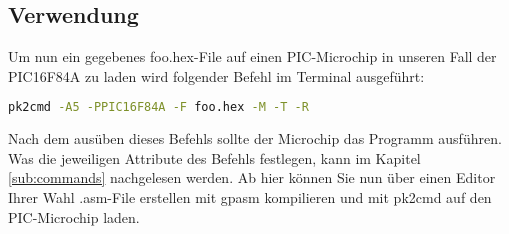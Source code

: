 \subsection{Verwendung}
\label{sub:howToUse}
Um nun ein gegebenes {\ttfamily foo.hex}-File auf einen PIC-Microchip in unseren Fall der PIC16F84A zu laden wird folgender Befehl im Terminal ausgeführt:
\begin{lstlisting}[language=bash]
                   pk2cmd -A5 -PPIC16F84A -F foo.hex -M -T -R
\end{lstlisting}
Nach dem ausüben dieses Befehls sollte der Microchip das Programm ausführen. Was die jeweiligen Attribute des Befehls festlegen, kann im Kapitel \ref{sub:commands} nachgelesen werden. Ab hier können Sie nun über einen Editor Ihrer Wahl {\ttfamily .asm}-File erstellen mit {\ttfamily gpasm} kompilieren und mit {\ttfamily pk2cmd} auf den PIC-Microchip laden.
